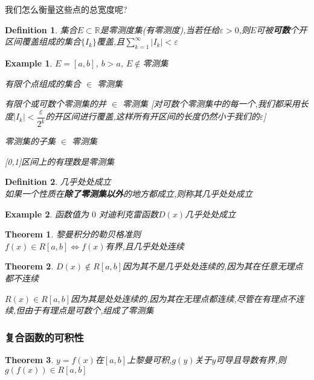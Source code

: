 \documentclass[11pt,hyperref,a4paper,UTF8]{ctexart}
\newtheorem{theorem}{Theorem}[subsection]
\newtheorem{example}{Example}[subsection]
\newtheorem{definition}{Definition}[subsection]
\newcommand{\RR}{\mathbb{R}}
\begin{document}
\begin{CJK}{UTF8}{gkai}
我们怎么衡量这些点的总宽度呢?

\begin{definition}
  集合$E \subset \RR$是零测度集(有零测度),当若任给$\varepsilon > 0$,则$E$可被\textbf{可数}个开区间覆盖组成的集合$\{I_k\}$覆盖,且$\sum_{k = 1}^{\infty}|I_k| < \varepsilon$
\end{definition}

\begin{example}
  $E = [a,b]$, $b > a$, $E \notin $零测集

  有限个点组成的集合 $\in$ 零测集

  有限个或可数个零测集的并 $\in$ 零测集
  [对可数个零测集中的每一个,我们都采用长度$|I_k| < \dfrac{\varepsilon}{2^k}$的开区间进行覆盖,这样所有开区间的长度仍然小于我们的$\varepsilon$]

  零测集的子集 $\in$ 零测集

  [0,1]区间上的有理数是零测集
\end{example}

\begin{definition}
  几乎处处成立\\

  如果一个性质在\textbf{除了零测集以外}的地方都成立,则称其几乎处处成立
\end{definition}

\begin{example}
  函数值为 $0$ 对迪利克雷函数$D(x)$几乎处处成立
\end{example}

\begin{theorem}
  黎曼积分的勒贝格准则\\

  $f(x) \in R[a,b] \Leftrightarrow f(x)$有界,且几乎处处连续
\end{theorem}

\begin{theorem}
  $D(x) \notin R[a,b]$因为其不是几乎处处连续的,因为其在任意无理点都不连续

  $R(x) \in R[a,b]$因为其是处处连续的,因为其在无理点都连续,尽管在有理点不连续,但由于有理点是可数个,组成了零测集
\end{theorem}

\subsubsection{复合函数的可积性}
\begin{theorem}
  
  $y = f(x)$在$[a,b]$上黎曼可积,$g(y)$关于$y$可导且导数有界,则$g(f(x))\in R[a,b]$
  

\end{theorem}
\end{CJK}
\end{document}
